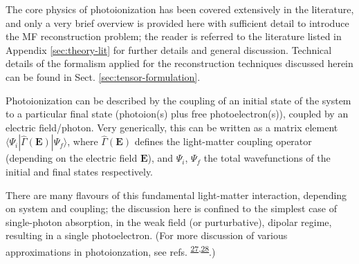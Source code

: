 \documentclass[10pt]{article}
\begin{document}


The core physics of photoionization has been covered extensively in the literature, and only a very brief overview is provided here with sufficient detail to introduce the MF reconstruction problem; the reader is referred to the literature listed in Appendix \ref{sec:theory-lit} for further details and general discussion. Technical details of the formalism applied for the reconstruction techniques discussed herein can be found in Sect. \ref{sec:tensor-formulation}.

Photoionization can be described by the coupling of an initial state of the system to a particular final state (photoion(s) plus free photoelectron(s)), coupled by an electric field/photon. Very generically, this can be written as a matrix element $\langle\Psi_i|\hat{\Gamma}(\boldsymbol{\mathbf{E}})|\Psi_f\rangle$, where $\hat{\Gamma}(\boldsymbol{\mathbf{E}})$ defines the light-matter coupling operator (depending on the electric field $\boldsymbol{\mathbf{E}}$), and $\Psi_i$, $\Psi_f$ the total wavefunctions of the initial and final states respectively. 

There are many flavours of this fundamental light-matter interaction, depending on system and coupling; the discussion here is confined to the simplest case of single-photon absorption, in the weak field (or purturbative), dipolar regime, resulting in a single photoelectron. (For more discussion of various approximations in photoionzation, see refs. \textsuperscript{\hyperref[csl:27]{27},\hyperref[csl:28]{28}}.)

\end{document}
